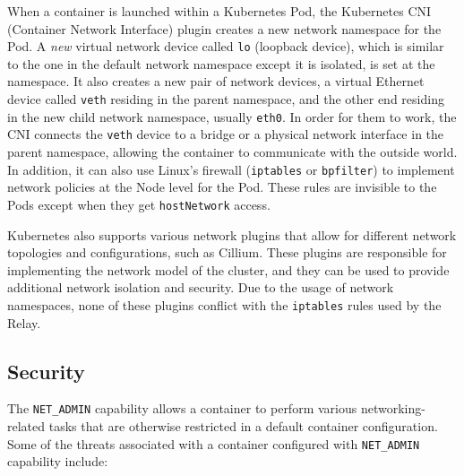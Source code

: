 \documentclass[a4paper, twocolumn]{article}
\begin{document}
When a container is launched within a Kubernetes Pod, the Kubernetes CNI
(Container Network Interface) plugin creates a new network namespace for the
Pod. A \textit{new} virtual network device called \texttt{lo} (loopback
device), which is similar to the one in the default network namespace except it
is isolated, is set at the namespace. It also creates a new pair of network
devices, a virtual Ethernet device called \texttt{veth} residing in the parent
namespace, and the other end residing in the new child network namespace,
usually \texttt{eth0}. In order for them to work, the CNI connects the
\texttt{veth} device to a bridge or a physical network interface in the parent
namespace, allowing the container to communicate with the outside world. In
addition, it can also use Linux's firewall (\texttt{iptables} or
\texttt{bpfilter}) to implement network policies at the Node level for the Pod.
These rules are invisible to the Pods except when they get \texttt{hostNetwork}
access.

Kubernetes also supports various network plugins that allow for different
network topologies and configurations, such as Cillium. These plugins are
responsible for implementing the network model of the cluster, and they can be
used to provide additional network isolation and security. Due to the usage of
network namespaces, none of these plugins conflict with the \texttt{iptables}
rules used by the Relay.

\subsection{Security}

The \texttt{NET\_ADMIN} capability allows a container to perform various
networking-related tasks that are otherwise restricted in a default container
configuration. Some of the threats associated with a container configured with
\texttt{NET\_ADMIN} capability include:
\end{document}
